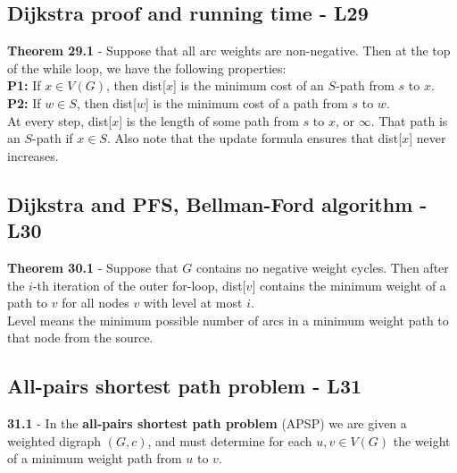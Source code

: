 \documentclass[a4paper]{article}
\begin{document}
\subsection*{Dijkstra proof and running time - L29}
\textbf{Theorem 29.1} - Suppose that all arc weights are non-negative. Then at the top of
the while loop, we have the following properties:\\
\textbf{P1:} If $x \in V(G)$, then dist[$x$] is the minimum cost of an $S$-path from $s$ to $x$.\\
\textbf{P2:} If $w \in S$, then dist[$w$] is the minimum cost of a path from $s$ to $w$.\\
At every step, dist[$x$] is the length of some path from $s$ to $x$, or $\infty$. That path is
an $S$-path if $x \in S$. Also note that the update formula ensures that dist[$x$] never
increases.
   
\subsection*{Dijkstra and PFS, Bellman-Ford algorithm - L30}
\textbf{Theorem 30.1} - Suppose that $G$ contains no negative weight cycles. Then after
the $i$-th iteration of the outer for-loop, dist[$v$] contains the minimum weight of a
path to $v$ for all nodes $v$ with level at most $i$.\\
Level means the minimum possible number of arcs in a minimum
weight path to that node from the source.

\subsection*{All-pairs shortest path problem - L31}
\textbf{31.1} - In the \textbf{ all-pairs shortest path problem} (APSP) we are given a
weighted digraph $(G, c)$, and must determine for each $u, v \in V(G)$ the weight of a
minimum weight path from $u$ to $v$.
\end{document}
